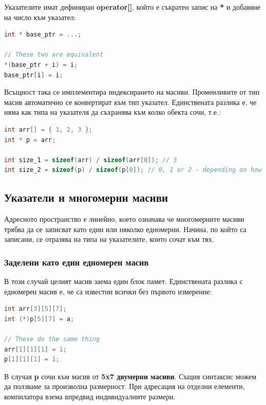 \documentclass[fleqn,12pt]{article}
\begin{document}
Указателите имат дефиниран \textbf{operator[]}, който е съкратен запис на \textbf{*} и добавяне на число към указател:
\begin{lstlisting}[language=C++, caption=Pointer example 3]
int * base_ptr = ...;

// These two are equivalent
*(base_ptr + i) = i;
base_ptr[i] = i;
\end{lstlisting}

Всъщност така се имплементира индексирането на масиви. Променливите от тип масив автоматично се конвертират към тип указател.
Единствената разлика е, че няма как типа на указателя да съхранява към колко обекта сочи, т.е.:

\begin{lstlisting}[language=C++, caption=Pointer example 3]
int arr[] = { 1, 2, 3 };
int * p = arr;

int size_1 = sizeof(arr) / sizeof(arr[0]); // 3
int size_2 = sizeof(p) / sizeof(p[0]); // 0, 1 or 2 - depending on how big the pointer is wrt to the int type
\end{lstlisting}

\subsection{Указатели и многомерни масиви}
Адресното пространство е линейно, което означава че многомерните масиви трябва да се записват като един или няколко едномерни.
Начина, по който са записани, се отразява на типа на указателите, които сочат към тях.

\subsubsection{Заделени като един едномерен масив}
В този случай целият масив заема един блок памет. Единствената разлика с едномерен масив е, че са известни всички без първото измерение:
\begin{lstlisting}[language=C++, caption=Multidimensional pointers]
int arr[3][5][7];
int (*)p[5][7] = a;

// These do the same thing
arr[1][1][1] = 1;
p[1][1][1] = 1;
\end{lstlisting}

В случая \textbf{p} сочи към масив от \textbf{5x7 двумерни масиви}. Същия синтаксис можем да ползваме за произволна размерност.
При адресация на отделни елементи, компилатора взема впредвид индивидуалните размери.
\end{document}
